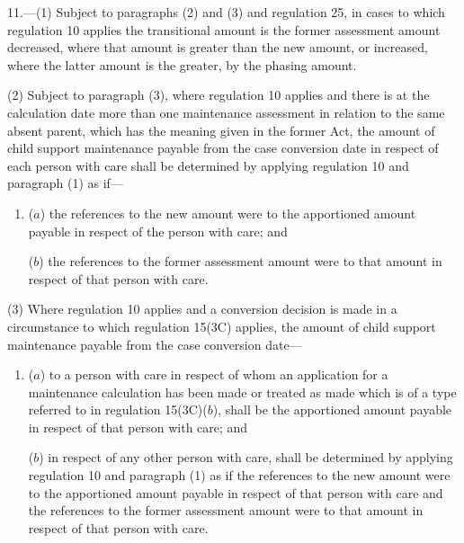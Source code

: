 \documentclass[12pt,a4paper]{article}
\begin{document}
11.---(1)  Subject to 
paragraphs (2) and (3)  %
and regulation 25, in cases to which regulation 10 applies the transitional amount is the former assessment amount decreased, where that amount is greater than the new amount, or increased, where the latter amount is the greater, by the phasing amount.

%

(2) Subject to paragraph (3), where regulation 10 applies and there is at the calculation date more than one maintenance assessment in relation to the same absent parent, which has the meaning given in the former Act, the amount of child support maintenance payable from the case conversion date in respect of each person with care shall be determined by applying regulation 10 and paragraph (1) as if—
\begin{enumerate}\item[]
($a$) the references to the new amount were to the apportioned amount payable in respect of the person with care; and

($b$) the references to the former assessment amount were to that amount in respect of that person with care.
\end{enumerate}

(3) Where regulation 10 applies and a conversion decision is made in a circumstance to which regulation 15(3C) applies, the amount of child support maintenance payable from the case conversion date—
\begin{enumerate}\item[]
($a$) to a person with care in respect of whom an application for a maintenance calculation has been made or treated as made which is of a type referred to in regulation 15(3C)($b$), shall be the apportioned amount payable in respect of that person with care; and

($b$) in respect of any other person with care, shall be determined by applying regulation 10 and paragraph (1) as if the references to the new amount were to the apportioned amount payable in respect of that person with care and the references to the former assessment amount were to that amount in respect of that person with care.
\end{enumerate}
\end{document}

